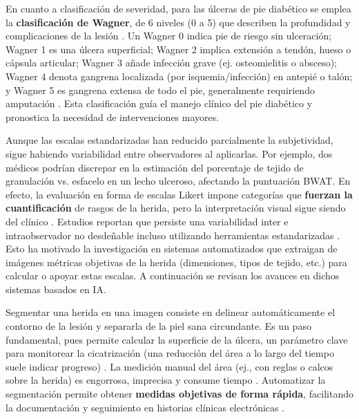 En cuanto a clasificación de severidad, para las úlceras de pie diabético se emplea la \textbf{clasificación de Wagner}, de 6 niveles (0 a 5) que describen la profundidad y complicaciones de la lesión . Un Wagner 0 indica pie de riesgo sin ulceración; Wagner 1 es una úlcera superficial; Wagner 2 implica extensión a tendón, hueso o cápsula articular; Wagner 3 añade infección grave (ej. osteomielitis o absceso); Wagner 4 denota gangrena localizada (por isquemia/infección) en antepié o talón; y Wagner 5 es gangrena extensa de todo el pie, generalmente requiriendo amputación \cite{Girmaw2025}. Esta clasificación guía el manejo clínico del pie diabético y pronostica la necesidad de intervenciones mayores.

Aunque las escalas estandarizadas han reducido parcialmente la subjetividad, sigue habiendo variabilidad entre observadores al aplicarlas. Por ejemplo, dos médicos podrían discrepar en la estimación del porcentaje de tejido de granulación vs. esfacelo en un lecho ulceroso, afectando la puntuación BWAT. En efecto, la evaluación en forma de escalas Likert impone categorías que \textbf{fuerzan la cuantificación} de rasgos de la herida, pero la interpretación visual sigue siendo del clínico . Estudios reportan que persiste una variabilidad inter e intraobservador no desdeñable incluso utilizando herramientas estandarizadas . Esto ha motivado la investigación en sistemas automatizados que extraigan de imágenes métricas objetivas de la herida (dimensiones, tipos de tejido, etc.) para calcular o apoyar estas escalas. A continuación se revisan los avances en dichos sistemas basados en IA.

Segmentar una herida en una imagen consiste en delinear automáticamente el contorno de la lesión y separarla de la piel sana circundante. Es un paso fundamental, pues permite calcular la superficie de la úlcera, un parámetro clave para monitorear la cicatrización (una reducción del área a lo largo del tiempo suele indicar progreso) \cite{Wang2020}. La medición manual del área (ej., con reglas o calcos sobre la herida) es engorrosa, imprecisa y consume tiempo \cite{Filko2023}. Automatizar la segmentación permite obtener \textbf{medidas objetivas de forma rápida}, facilitando la documentación y seguimiento en historias clínicas electrónicas . 

